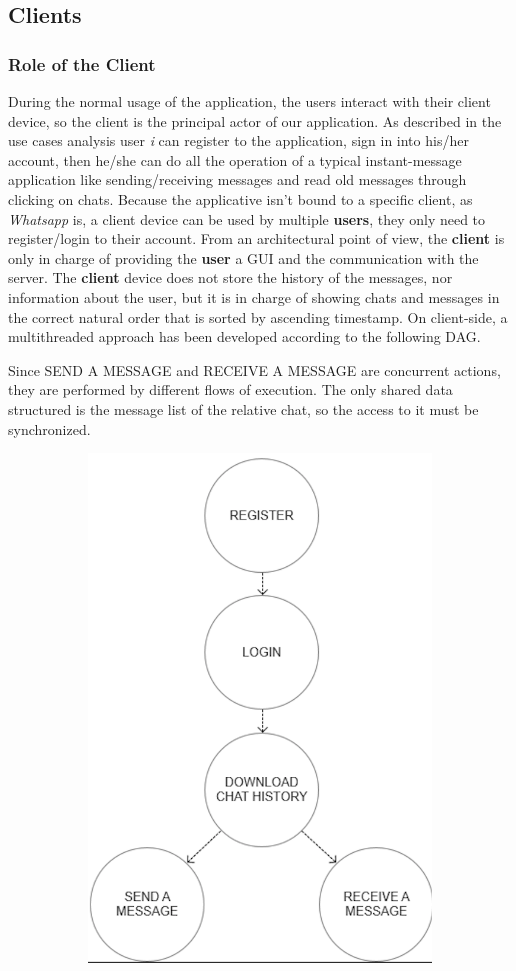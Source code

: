 \subsection{Clients}
\subsubsection{Role of the Client}
During the normal usage of the application, the users interact with their client device, so the client is the principal actor of our application.
As described in the use cases analysis user \textit{i} can register to the application, sign in into his/her account, then he/she can do all the operation of a typical instant-message application like sending/receiving messages and read old messages through clicking on chats. Because the applicative isn’t bound to a specific client, as \textit{Whatsapp} is, a client device can be used by multiple \textbf{users}, they only need to register/login to their account.
From an architectural point of view, the \textbf{client} is only in charge of providing the \textbf{user} a GUI and the communication with the server. The \textbf{client}  device does not store the history of the messages, nor information about the user, but it is in charge of showing chats and messages in the correct natural order that is sorted by ascending timestamp. On client-side, a multithreaded approach has been developed according to the following DAG.

Since SEND A MESSAGE and RECEIVE A MESSAGE are concurrent actions, they are performed by different flows of execution. The only shared data structured is the message list of the relative chat, so the access to it must be synchronized.

\begin{figure}[H]
	\begin{subfigure}{\textwidth}
	\centering
		\includegraphics[width=0.3\linewidth]{img/dag.png} 
	\end{subfigure}
\end{figure}

